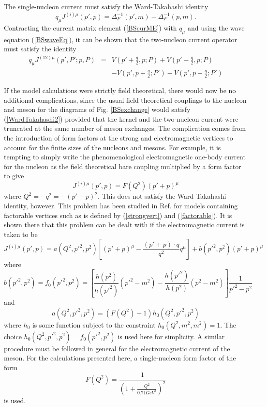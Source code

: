 \documentclass[mythesis.tex]{subfiles}
\begin{document}
The single-nucleon current must satisfy the Ward-Takahashi identity
\cite{WardTakahashi}
%
\begin{equation}
q_\mu J^{(i) \mu}(p',p)=\Delta^{-1}_F(p',m)-\Delta^{-1}_F(p,m).
\label{WardTakahashi1}
\end{equation}
%
Contracting the current matrix element (\ref{BScurME}) with $q_\mu$ and
using the wave equation (\ref{BSwaveEq}), it can be shown that the
two-nucleon current operator must satisfy the identity \cite{GrossandRiska}
%
\begin{eqnarray}
q_\mu J^{(12) \mu}(p',P';p,P)&=&V(p'+\frac{q}{2},p;P)+
V(p'-\frac{q}{2},p;P) \nonumber \\
& &-V(p',p+\frac{q}{2};P')-V(p',p-\frac{q}{2};P')
\label{WardTakahashi2}
\end{eqnarray}

If the model calculations were strictly field theoretical, there would now
be no additional complications, since the usual field theoretical couplings
to the nucleon and meson for the diagrams of Fig. \ref{BSexchange}
would satisfy (\ref{WardTakahashi2}) provided that the kernel and the
two-nucleon current were truncated at the same number of meson exchanges.
The complication comes from the introduction of form factors at the strong
and electromagnetic vertices to account for the finite sizes of the
nucleons and mesons. For example, it is tempting to simply write the
phenomenological electromagnetic one-body current for the nucleon as the
field theoretical bare coupling multiplied by a form factor to give
%
\begin{equation}
J^{(i) \mu}(p',p)=F(Q^2)(p'+p)^\mu
\end{equation}
%
where $Q^2=-q^2=-(p'-p)^2$.
This does not satisfy the Ward-Takahashi identity, however. This problem
has been studied in Ref. \cite{GrossandRiska} for models containing
factorable vertices
such as is defined by (\ref{strongvert}) and (\ref{factorable}). It is
shown there that this problem can be dealt with if the electromagnetic
current is taken to be
%
\begin{equation}
J^{(i) \mu}(p',p)=a(Q^2,p'^2,p^2)\left[ (p'+p)^\mu-\frac{(p'+p)\cdot q}{q^2}
q^\mu\right]+b(p'^2,p^2)(p'+p)^\mu \label{scalaroff}
\end{equation}
%
where
%
\begin{equation}
b(p'^2,p^2)=f_0(p'^2,p^2)=
\left[ \frac{h(p^2)}{h(p'^2)}(p'^2-m^2)
-\frac{h(p'^2)}{h(p^2)}(p^2-m^2)\right] \frac{1}{p'^2-p^2}
\end{equation}
%
and
%
\begin{equation}
a(Q^2,p'^2,p^2)=(F(Q^2)-1)h_0(Q^2,p'^2,p^2)
\end{equation}
%
where $h_0$ is some function subject to the constraint $h_0(Q^2,m^2,m^2)=1$.
The choice $h_0(Q^2,p'^2,p^2)=f_0(p'^2,p^2)$ is used here for simplicity.
A similar procedure must be followed in general for the electromagnetic
current of the meson. For the calculations presented here,  a
single-nucleon form factor of the form
%
\begin{equation}
F(Q^2)=\frac{1}{\left( 1+\frac{Q^2}{0.71 GeV^2}\right)^2}
\end{equation}
is used.
\end{document}
